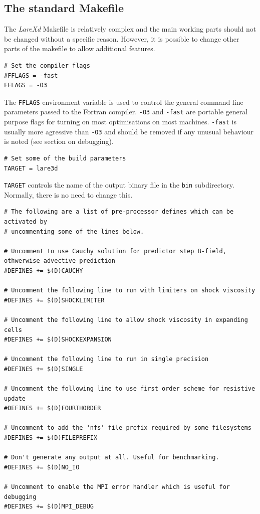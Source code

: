 \documentclass[11pt]{article}
\begin{document}
\subsection{The standard Makefile}
The {\it LareXd} Makefile is relatively complex and the main working parts should not be changed without a specific reason. 
However, it is possible to change other parts of the makefile to allow additional features.\\
\begin{verbatim}
# Set the compiler flags
#FFLAGS = -fast
FFLAGS = -O3
\end{verbatim}
The \texttt{FFLAGS} environment variable is used to control the general command line parameters passed to the Fortran compiler. 
\texttt{-O3} and \texttt{-fast} are portable general purpose flags for turning on most optimisations on most machines. 
\texttt{-fast} is usually more agressive than \texttt{-O3} and should be removed if any unusual behaviour is noted (see section on debugging).
\begin{verbatim}
# Set some of the build parameters
TARGET = lare3d
\end{verbatim}
\texttt{TARGET} controls the name of the output binary
file in the \texttt{bin} subdirectory. Normally, there is no need to change this.
\begin{verbatim}
# The following are a list of pre-processor defines which can be activated by 
# uncommenting some of the lines below.

# Uncomment to use Cauchy solution for predictor step B-field, othwerwise advective prediction
#DEFINES += $(D)CAUCHY

# Uncomment the following line to run with limiters on shock viscosity
#DEFINES += $(D)SHOCKLIMITER

# Uncomment the following line to allow shock viscosity in expanding cells
#DEFINES += $(D)SHOCKEXPANSION

# Uncomment the following line to run in single precision
#DEFINES += $(D)SINGLE

# Uncomment the following line to use first order scheme for resistive update
#DEFINES += $(D)FOURTHORDER

# Uncomment to add the 'nfs' file prefix required by some filesystems
#DEFINES += $(D)FILEPREFIX

# Don't generate any output at all. Useful for benchmarking.
#DEFINES += $(D)NO_IO

# Uncomment to enable the MPI error handler which is useful for debugging
#DEFINES += $(D)MPI_DEBUG
\end{verbatim}
\end{document}
